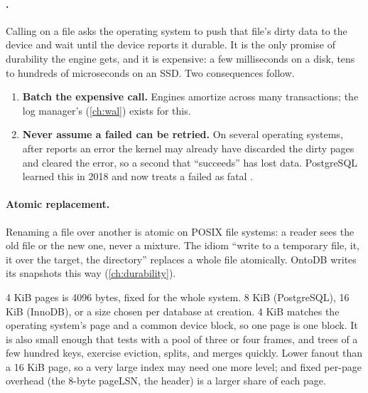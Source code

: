 \paragraph{.} Calling  on a file asks the operating
system to push that file's dirty data to the device and wait until the device
reports it durable. It is the only promise of durability the engine gets, and
it is expensive: a few milliseconds on a disk, tens to hundreds of microseconds
on an SSD. Two consequences follow.

\begin{enumerate}
\item \textbf{Batch the expensive call.} Engines amortize  across many transactions; the log manager's  (\cref{ch:wal}) exists for this.
\item \textbf{Never assume a failed  can be retried.} On several operating systems, after  reports an error the kernel may already have discarded the dirty pages and cleared the error, so a second  that ``succeeds'' has lost data. PostgreSQL learned this in 2018 and now treats a failed  as fatal \cite{fsyncgate,pillai2014}.
\end{enumerate}

\paragraph{Atomic replacement.} Renaming a file over another is atomic on POSIX
file systems: a reader sees the old file or the new one, never a mixture. The
idiom ``write to a temporary file,  it,  it over the
target,  the directory'' replaces a whole file atomically. OntoDB
writes its snapshots this way (\cref{ch:durability}).

\begin{decision}{4 KiB pages}
  is 4096 bytes, fixed for the whole system.
 8 KiB (PostgreSQL), 16 KiB (InnoDB), or a size chosen per
database at creation.
 4 KiB matches the operating system's page and a common device
block, so one page is one block. It is also small enough that tests with a
pool of three or four frames, and trees of a few hundred keys, exercise
eviction, splits, and merges quickly.
 Lower fanout than a 16 KiB page, so a very large index may need
one more level; and fixed per-page overhead (the 8-byte pageLSN, the header) is
a larger share of each page.
\end{decision}

